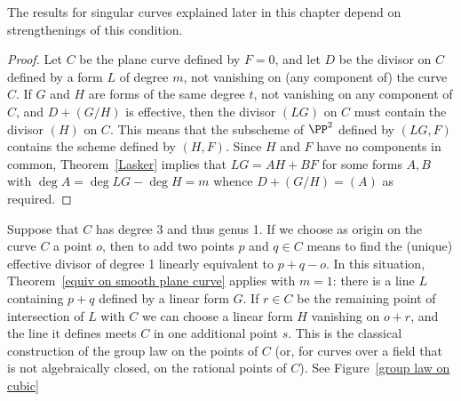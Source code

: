  The results for singular curves explained later in this chapter
 depend on strengthenings  of this condition.
 
\begin{proof}
Let $C$ be the plane curve defined by $F=0$, and let $D$ be the divisor on $C$ defined by a form $L$
of degree $m$, not vanishing on (any component of) the curve $C$. If $G$ and $H$ are forms of the same degree $t$, 
not vanishing on any component of $C$,
and $D+(G/H)$ is effective, then the divisor $(LG)$  on $C$ must contain the divisor $(H)$ on $C$.
This means that the subscheme of $\PP^{2}$ defined by $(LG,F)$ contains the scheme defined 
by $(H,F)$. Since $H$ and $F$ have no components in common, Theorem~\ref{Lasker} implies
that $LG = AH+BF$  for some forms $A,B$ with $\deg A = \deg LG -\deg H = m$ whence $D+(G/H) = (A)$
as required.
\end{proof}

\begin{example}
Suppose that $C$ has degree 3 and thus genus 1. If we choose as origin on the curve $C$ a point $o$, then to add two points $p$ and $q \in C$ means to find the (unique) effective divisor of degree 1 linearly equivalent to $p + q - o$. In this situation, Theorem~\ref{equiv on smooth plane curve} applies with $m=1$: there is a line $L$ 
containing $p+q$ defined by a linear form $G$. If $r \in C$ be the remaining point of intersection of $L$ with $C$ we can choose a linear form $H$ vanishing on $o+r$, and the line it defines meets $C$
in one additional point $s$. This is the classical construction of the group law on the points of $C$ (or,
for curves over a field that is not algebraically closed, on the rational points of $C$).
See Figure~\ref{group law on cubic}
\end{example}


